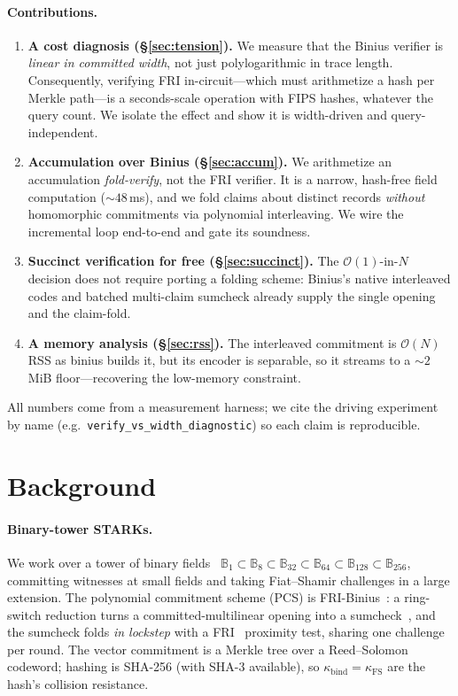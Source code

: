 \documentclass[11pt]{article}
\newcommand{\bt}{\mathbb{B}}
\newcommand{\field}[1]{\bt_{#1}}
\newcommand{\kbind}{\kappa_{\mathrm{bind}}}
\newcommand{\kfs}{\kappa_{\mathrm{FS}}}
\newcommand{\bigO}{\mathcal{O}}
\begin{document}
\paragraph{Contributions.}
\begin{enumerate}[nosep,leftmargin=*]
  \item \textbf{A cost diagnosis (\S\ref{sec:tension}).} We measure that the
  Binius verifier is \emph{linear in committed width}, not just polylogarithmic
  in trace length. Consequently, verifying FRI in-circuit---which must
  arithmetize a hash per Merkle path---is a seconds-scale operation with FIPS
  hashes, whatever the query count. We isolate the effect and show it is
  width-driven and query-independent.
  \item \textbf{Accumulation over Binius (\S\ref{sec:accum}).} We arithmetize an
  accumulation \emph{fold-verify}, not the FRI verifier. It is a narrow,
  hash-free field computation ($\sim48$\,ms), and we fold claims about distinct
  records \emph{without} homomorphic commitments via polynomial interleaving. We
  wire the incremental loop end-to-end and gate its soundness.
  \item \textbf{Succinct verification for free (\S\ref{sec:succinct}).} The
  $\bigO(1)$-in-$N$ decision does not require porting a folding scheme: Binius's
  native interleaved codes and batched multi-claim sumcheck already supply the
  single opening and the claim-fold.
  \item \textbf{A memory analysis (\S\ref{sec:rss}).} The interleaved commitment
  is $\bigO(N)$ RSS as binius builds it, but its encoder is separable, so it
  streams to a $\sim2$\,MiB floor---recovering the low-memory constraint.
\end{enumerate}
All numbers come from a measurement harness; we cite the driving experiment by
name (e.g.\ \texttt{verify\_vs\_width\_diagnostic}) so each claim is reproducible.

\section{Background}\label{sec:bg}

\paragraph{Binary-tower STARKs.} We work over a tower of binary
fields~\cite{binius}
$\field{1}\subset\field{8}\subset\field{32}\subset\field{64}\subset\field{128}
\subset\field{256}$, committing witnesses at small fields and taking Fiat--Shamir
challenges in a large extension. The polynomial commitment scheme (PCS) is
FRI-Binius~\cite{fribinius}: a ring-switch reduction turns a
committed-multilinear opening into a sumcheck~\cite{sumcheck}, and the sumcheck
folds \emph{in lockstep} with a FRI~\cite{fri} proximity test, sharing one
challenge per round. The vector commitment is a Merkle tree over a
Reed--Solomon codeword; hashing is SHA-256 (with SHA-3 available), so
$\kbind=\kfs$ are the hash's collision resistance.
\end{document}
